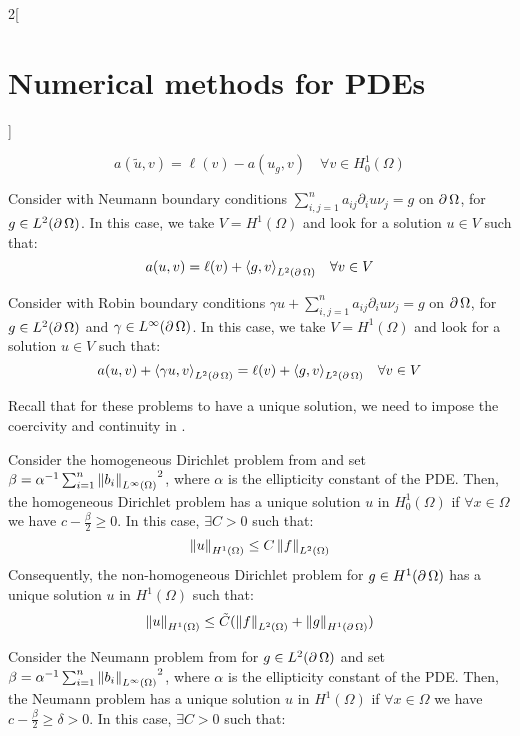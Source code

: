 \documentclass[../../../main_math.tex]{subfiles}
\begin{document}
\begin{multicols}{2}[\section{Numerical methods for PDEs}]
\begin{definition}
    $$
      a(\tilde{u},v)=\ell(v)-a(u_g,v)\quad\forall v\in H^1_0(\Omega)
    $$
  \end{definition}
  \begin{definition}
    Consider  with Neumann boundary conditions $\sum_{i,j=1}^n a_{ij}\partial_i u\nu_j=g$ on $\operatorname{\partial}\Omega$, for $g\in L^2(\operatorname{\partial}\Omega)$. In this case, we take $V=H^1(\Omega)$ and look for a solution $u\in V$ such that:
    $$
      a(u,v)=\ell(v)+{\langle g,v\rangle}_{L^2(\operatorname{\partial}\Omega)}\quad\forall v\in V
    $$
  \end{definition}
  \begin{definition}
    Consider  with Robin boundary conditions $\gamma u+\sum_{i,j=1}^n a_{ij}\partial_i u\nu_j=g$ on $\operatorname{\partial}\Omega$, for $g\in L^2(\operatorname{\partial}\Omega)$ and $\gamma\in L^\infty(\operatorname{\partial}\Omega)$. In this case, we take $V=H^1(\Omega)$ and look for a solution $u\in V$ such that:
    $$
      a(u,v)+{\langle \gamma u,v\rangle}_{L^2(\operatorname{\partial}\Omega)}=\ell(v)+{\langle g,v\rangle}_{L^2(\operatorname{\partial}\Omega)}\quad\forall v\in V
    $$
  \end{definition}
  \begin{remark}
    Recall that for these problems to have a unique solution, we need to impose the coercivity and continuity in .
  \end{remark}
  \begin{proposition}
    Consider the homogeneous Dirichlet problem from  and set $\beta=\alpha^{-1}\sum_{i=1}^n{\left\|b_i\right\|_{L^\infty(\Omega)}}^2$, where $\alpha$ is the ellipticity constant of the PDE. Then, the homogeneous Dirichlet problem has a unique solution $u$ in $H_0^1(\Omega)$ if $\forall x\in\Omega$ we have $c-\frac{\beta}{2}\geq 0$. In this case, $\exists C>0$ such that:
    $$
      \left\|u\right\|_{H^1(\Omega)}\leq C\left\|f\right\|_{L^2(\Omega)}
    $$
    Consequently, the non-homogeneous Dirichlet problem for $g\in H^1(\operatorname{\partial}\Omega)$ has a unique solution $u$ in $H^1(\Omega)$ such that:
    $$
      \left\|u\right\|_{H^1(\Omega)}\leq \tilde{C}(\left\|f\right\|_{L^2(\Omega)}+\left\|g\right\|_{H^1(\operatorname{\partial}\Omega)})
    $$
  \end{proposition}
  \begin{proposition}
    Consider the Neumann problem from  for $g\in L^2(\operatorname{\partial}\Omega)$ and set $\beta=\alpha^{-1}\sum_{i=1}^n{\left\|b_i\right\|_{L^\infty(\Omega)}}^2$, where $\alpha$ is the ellipticity constant of the PDE. Then, the Neumann problem has a unique solution $u$ in $H^1(\Omega)$ if $\forall x\in\Omega$ we have $c-\frac{\beta}{2}\geq\delta> 0$. In this case, $\exists C>0$ such that:

\end{proposition}
\end{multicols}
\end{document}
